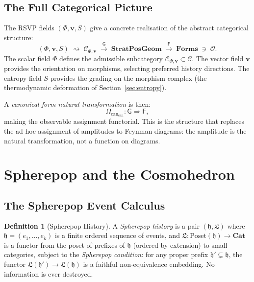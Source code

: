 \documentclass[12pt, oneside]{amsart}
\theoremstyle{plain}
\theoremstyle{definition}
\newtheorem{definition}[theorem]{Definition}
\theoremstyle{remark}
\newcommand{\Phif}{\Phi}   %
\newcommand{\Sf}{S}         %
\newcommand{\hist}{\mathfrak{h}}
\newcommand{\Log}{\mathfrak{L}}
\newcommand{\CF}{\Omega_{\mathrm{can}}}
\newcommand{\SPG}{\mathbf{StratPosGeom}}
\newcommand{\Forms}{\mathbf{Forms}}
\newcommand{\Ccat}{\mathcal{C}_{\Phi,\mathbf{v}}}
\newcommand{\Gfun}{\mathsf{G}}
\newcommand{\Ffun}{\mathsf{F}}
\newcommand{\Ofun}{\mathcal{O}}
\begin{document}
\subsection{The Full Categorical Picture}

The RSVP fields $(\Phif, \mathbf{v}, \Sf)$ give a concrete realisation of the abstract categorical structure:
\begin{equation}
\label{eq:full-chain}
  (\Phif, \mathbf{v}, \Sf) \;\rightsquigarrow\; \Ccat \;\xrightarrow{\Gfun}\; \SPG \;\xrightarrow{\Ffun}\; \Forms \;\ni\; \Ofun.
\end{equation}
The scalar field $\Phif$ defines the admissible subcategory $\Ccat \subset \mathcal{C}$. The vector field $\mathbf{v}$ provides the orientation on morphisms, selecting preferred history directions. The entropy field $\Sf$ provides the grading on the morphism complex (the thermodynamic deformation of Section~\ref{sec:entropy}).

A \emph{canonical form natural transformation} is then:
\[
  \CF_{\mathrm{can}}: \Gfun \Rightarrow \Ffun,
\]
making the observable assignment functorial. This is the structure that replaces the ad hoc assignment of amplitudes to Feynman diagrams: the amplitude is the natural transformation, not a function on diagrams.

\section{Spherepop and the Cosmohedron}
\label{sec:spherepop}

\subsection{The Spherepop Event Calculus}

\begin{definition}[Spherepop History]
A \emph{Spherepop history} is a pair $(\hist, \Log)$ where $\hist = (e_1, \ldots, e_k)$ is a finite ordered sequence of events, and $\Log: \mathrm{Poset}(\hist) \to \mathbf{Cat}$ is a functor from the poset of prefixes of $\hist$ (ordered by extension) to small categories, subject to the \emph{Spherepop condition}: for any proper prefix $\hist' \subsetneq \hist$, the functor $\Log(\hist') \to \Log(\hist)$ is a faithful non-equivalence embedding. No information is ever destroyed.
\end{definition}
\end{document}
